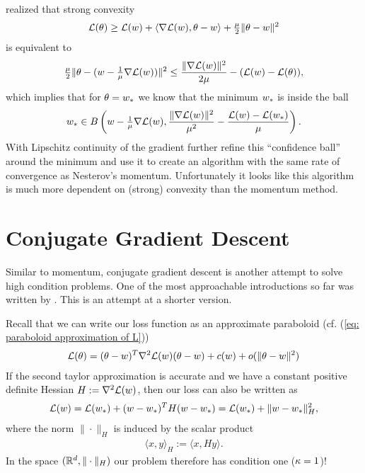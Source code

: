 \textcite{bubeckGeometricAlternativeNesterov2015} realized that strong convexity
\begin{align*}
	\mathcal{L}(\theta)
	\ge \mathcal{L}(w) + \langle \nabla\mathcal{L}(w), \theta-w\rangle
	+ \tfrac{\mu}{2}\|\theta-w\|^2
\end{align*}
is equivalent to
\begin{align*}
	\tfrac{\mu}{2}\|\theta - (w - \tfrac1{\mu} \nabla\mathcal{L}(w))\|^2
	\le \frac{\|\nabla\mathcal{L}(w)\|^2}{2\mu} - (\mathcal{L}(w)-\mathcal{L}(\theta)),
\end{align*}
which implies that for \(\theta=w_*\) we know that the minimum
\(w_*\) is inside the ball
\begin{align*}
	w_*\in B\left(w- \tfrac1{\mu}\nabla\mathcal{L}(w), 
		\frac{\|\nabla\mathcal{L}(w)\|^2}{\mu^2}
		- \frac{ \mathcal{L}(w)-\mathcal{L}(w_*) }{\mu}
	\right).
\end{align*}
With Lipschitz continuity of the gradient \textcite{bubeckGeometricAlternativeNesterov2015}
further refine this ``confidence ball'' around the minimum and use it to create
an algorithm with the same rate of convergence as Nesterov's momentum.
Unfortunately it looks like this algorithm is much more dependent on (strong)
convexity than the momentum method.

\section{Conjugate Gradient Descent}\label{sec: conjugate gradient descent}

Similar to momentum, conjugate gradient descent is another attempt to solve
high condition problems. One of the most approachable introductions so far was
written by \textcite{shewchukIntroductionConjugateGradient1994}. This is an
attempt at a shorter version. 

Recall that we can write
our loss function as an approximate paraboloid (cf. (\ref{eq: paraboloid
approximation of L}))
\begin{align*}
	\mathcal{L}(\theta)
	= (\theta-w)^T \nabla^2\mathcal{L}(w)(\theta-w)
	+ c(w) + o(\|\theta-w\|^2)
\end{align*}
If the second taylor approximation is accurate and we have a constant
positive definite Hessian \(H:=\nabla^2\mathcal{L}(w)\), then our loss can also
be written as
\begin{align*}
	\mathcal{L}(w) = \mathcal{L}(w_*) + 
	(w-w_*)^T H(w-w_*)
	= \mathcal{L}(w_*) + \|w-w_*\|_H^2,
\end{align*}
where the norm \(\|\cdot\|_H\) is induced by the scalar product
\begin{align*}
	\langle x, y \rangle_H := \langle x, Hy\rangle.
\end{align*}
In the space \((\mathbb{R}^d, \|\cdot\|_H)\) our problem therefore has condition one
(\(\kappa=1\))!

